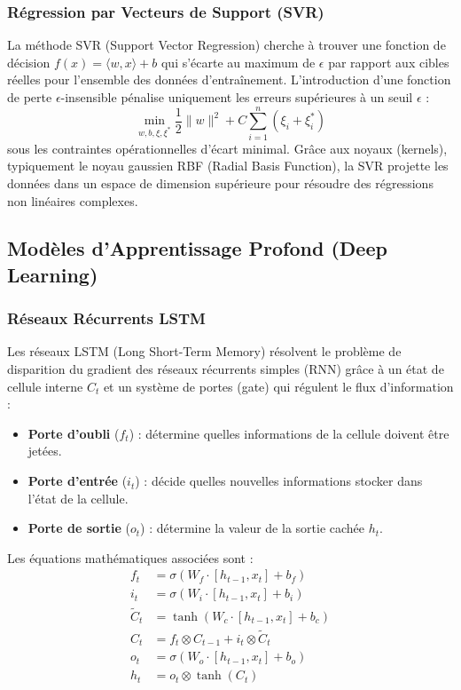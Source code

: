 \documentclass[11pt,a4paper]{article}
\begin{document}
\subsubsection{Régression par Vecteurs de Support (SVR)}
La méthode SVR (Support Vector Regression) cherche à trouver une fonction de décision $f(x) = \langle w, x \rangle + b$ qui s'écarte au maximum de $\epsilon$ par rapport aux cibles réelles pour l'ensemble des données d'entraînement. L'introduction d'une fonction de perte $\epsilon$-insensible pénalise uniquement les erreurs supérieures à un seuil $\epsilon$ :
\begin{equation}
    \min_{w, b, \xi, \xi^*} \frac{1}{2} \|w\|^2 + C \sum_{i=1}^{n} (\xi_i + \xi_i^*)
\end{equation}
sous les contraintes opérationnelles d'écart minimal. Grâce aux noyaux (kernels), typiquement le noyau gaussien RBF (Radial Basis Function), la SVR projette les données dans un espace de dimension supérieure pour résoudre des régressions non linéaires complexes.

\subsection{Modèles d'Apprentissage Profond (Deep Learning)}
\subsubsection{Réseaux Récurrents LSTM}
Les réseaux LSTM (Long Short-Term Memory) résolvent le problème de disparition du gradient des réseaux récurrents simples (RNN) grâce à un état de cellule interne $C_t$ et un système de portes (gate) qui régulent le flux d'information :
\begin{itemize}
    \item \textbf{Porte d'oubli} ($f_t$) : détermine quelles informations de la cellule doivent être jetées.
    \item \textbf{Porte d'entrée} ($i_t$) : décide quelles nouvelles informations stocker dans l'état de la cellule.
    \item \textbf{Porte de sortie} ($o_t$) : détermine la valeur de la sortie cachée $h_t$.
\end{itemize}
Les équations mathématiques associées sont :
\begin{align}
    f_t &= \sigma(W_f \cdot [h_{t-1}, x_t] + b_f) \\
    i_t &= \sigma(W_i \cdot [h_{t-1}, x_t] + b_i) \\
    \tilde{C}_t &= \tanh(W_c \cdot [h_{t-1}, x_t] + b_c) \\
    C_t &= f_t \otimes C_{t-1} + i_t \otimes \tilde{C}_t \\
    o_t &= \sigma(W_o \cdot [h_{t-1}, x_t] + b_o) \\
    h_t &= o_t \otimes \tanh(C_t)
\end{align}
\end{document}
